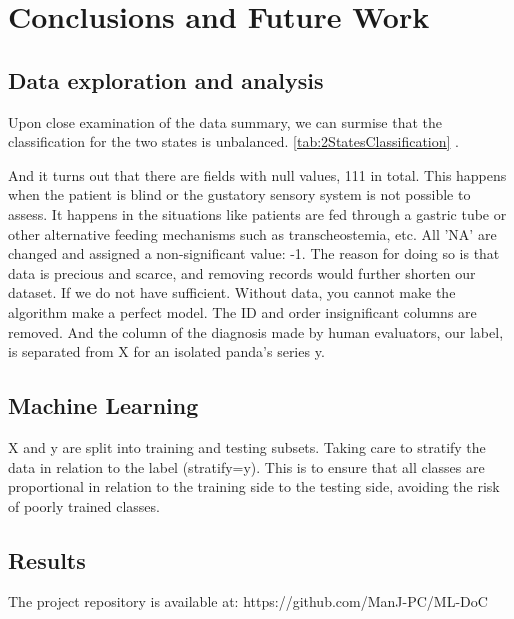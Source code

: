 



\chapter{Conclusions and Future Work} \label{chap:concl}

\section*{}


\section{Data exploration and analysis}

Upon close examination of the data summary, we can surmise that the classification for the two states is unbalanced. \ref{tab:2StatesClassification} .

And it turns out that there are fields with null values, 111 in total. This happens when the patient is blind or the gustatory sensory system is not possible to assess. It happens in the situations like patients are fed through a gastric tube or other alternative feeding mechanisms such as transcheostemia, etc.
All 'NA' are changed and assigned a non-significant value: -1. 
The reason for doing so is that data is precious and scarce, and removing records would further shorten our dataset. If we do not have sufficient. 
Without data, you cannot make the algorithm make a perfect model.
The ID and order insignificant columns are removed.
And the column of the diagnosis made by human evaluators, our label, is separated from X for an isolated panda's series y.

\section{Machine Learning}

X and y are split into training and testing subsets.
Taking care to stratify the data in relation to the label (stratify=y).
This is to ensure that all classes are proportional in relation to the training side to the testing side, avoiding the risk of poorly trained classes.
\clearpage

\section{Results}

The project repository is available at: https://github.com/ManJ-PC/ML-DoC


